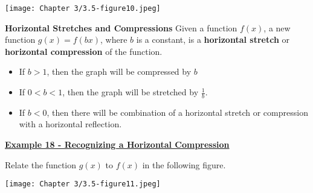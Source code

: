 \documentclass[12pt]{book}
\begin{document}
\centerline{\texttt{[image: Chapter 3/3.5-figure10.jpeg]}}
\vspace{3mm}

\begin{boxR}
    \textbf{Horizontal Stretches and Compressions}
    \vspace{1mm}
    \hline
    \vspace{2mm}
    Given a function $f(x)$, a new function $g(x)=f(bx)$, where $b$ is a constant, is a \textbf{horizontal stretch} or \textbf{horizontal compression} of the function.
    \begin{itemize}
        \item If $b > 1$, then the graph will be compressed by $b$
        \item If  $0<b<1$, then the graph will be stretched by $\frac{1}{b}$. 
        \item If $b <0$, then there will be combination of a horizontal stretch or compression with a horizontal reflection.
    \end{itemize}  
\end{boxR}


\newpage

\underline{\textbf{Example 18 - Recognizing a Horizontal Compression}}

Relate the function $g(x)$ to $f(x)$ in the following figure. 

\centerline{\texttt{[image: Chapter 3/3.5-figure11.jpeg]}}
\end{document}
